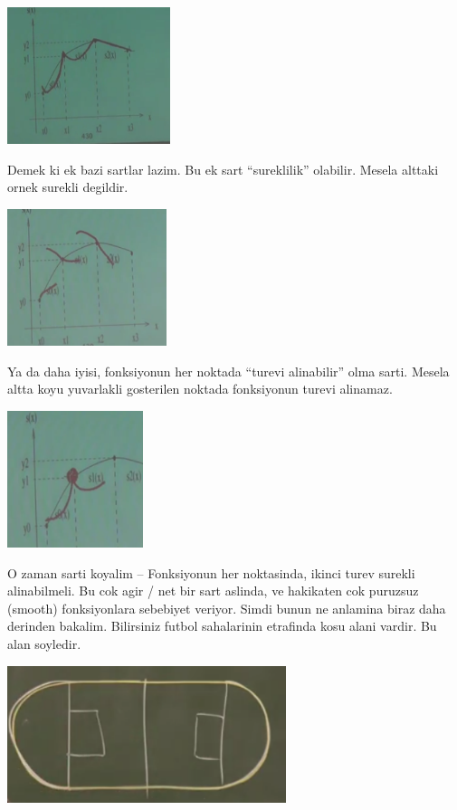 \documentclass[12pt,fleqn]{article}\usepackage{common}
\begin{document}
\includegraphics[height=4cm]{spline3.png}

Demek ki ek bazi sartlar lazim. Bu ek sart ``sureklilik'' olabilir. Mesela
alttaki ornek surekli degildir.

\includegraphics[height=4cm]{spline5.png}

Ya da daha iyisi, fonksiyonun her noktada ``turevi alinabilir'' olma
sarti. Mesela altta koyu yuvarlakli gosterilen noktada fonksiyonun turevi
alinamaz.

\includegraphics[height=4cm]{spline4.png}

O zaman sarti koyalim -- Fonksiyonun her noktasinda, ikinci turev surekli
alinabilmeli. Bu cok agir / net bir sart aslinda, ve hakikaten cok puruzsuz
(smooth) fonksiyonlara sebebiyet veriyor. Simdi bunun ne anlamina biraz
daha derinden bakalim. Bilirsiniz futbol sahalarinin etrafinda kosu alani
vardir. Bu alan soyledir.

\includegraphics[height=4cm]{spline6.png}
\end{document}
